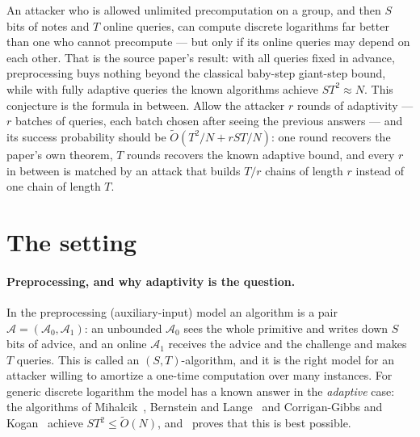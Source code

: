 \documentclass{aicr-conjecture}
\newcommand{\Adv}{\mathcal{A}}
\newcommand{\Ot}{\widetilde{O}}
\begin{document}

\vspace{0.4em}

\begin{informalconjecture}
An attacker who is allowed unlimited precomputation on a group, and
then $S$ bits of notes and $T$ online queries, can compute discrete
logarithms far better than one who cannot precompute --- but only if
its online queries may depend on each other. That is the source paper's
result: with all queries fixed in advance, preprocessing buys nothing
beyond the classical baby-step giant-step bound, while with fully
adaptive queries the known algorithms achieve $ST^{2} \approx N$. This
conjecture is the formula in between. Allow the attacker $r$ rounds of
adaptivity --- $r$ batches of queries, each batch chosen after seeing
the previous answers --- and its success probability should be
$\Ot(T^{2}/N + rST/N)$: one round recovers the paper's own theorem,
$T$ rounds recovers the known adaptive bound, and every $r$ in between
is matched by an attack that builds $T/r$ chains of length $r$ instead
of one chain of length $T$.
\end{informalconjecture}

\section{The setting}\label{sec:setting}

\paragraph{Preprocessing, and why adaptivity is the question.}
In the preprocessing (auxiliary-input) model an algorithm is a pair
$\Adv = (\Adv_{0}, \Adv_{1})$: an unbounded $\Adv_{0}$ sees the whole
primitive and writes down $S$ bits of advice, and an online $\Adv_{1}$
receives the advice and the challenge and makes $T$ queries. This is
called an $(S,T)$-algorithm, and it is the right model for an attacker
willing to amortize a one-time computation over many instances. For
generic discrete logarithm the model has a known answer in the
\emph{adaptive} case: the algorithms of Mihalcik~\cite{Mih10}, Bernstein
and Lange~\cite{BL13} and Corrigan-Gibbs and Kogan~\cite{CK18} achieve
$ST^{2} \le \Ot(N)$, and~\cite{CK18} proves that this is best possible.
\end{document}
